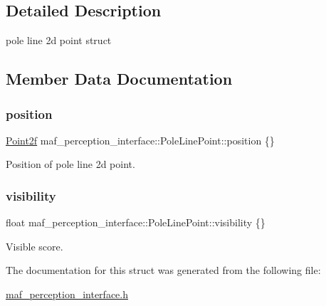 \subsection{Detailed Description}
pole line 2d point struct 

\subsection{Member Data Documentation}
\mbox{\label{structmaf__perception__interface_1_1PoleLinePoint_a6dcbf3c04ff7264c646ed626b6e497c4}} 
\subsubsection{\texorpdfstring{position}{position}}
{\footnotesize\ttfamily \hyperlink{structmaf__perception__interface_1_1Point2f}{Point2f} maf\+\_\+perception\+\_\+interface\+::\+Pole\+Line\+Point\+::position \{\}}



Position of pole line 2d point. 

\mbox{\label{structmaf__perception__interface_1_1PoleLinePoint_a7cb73abaca7893b818421376ffa92901}} 
\subsubsection{\texorpdfstring{visibility}{visibility}}
{\footnotesize\ttfamily float maf\+\_\+perception\+\_\+interface\+::\+Pole\+Line\+Point\+::visibility \{\}}



Visible score. 



The documentation for this struct was generated from the following file\+:\begin{DoxyCompactItemize}
\item 
\hyperlink{maf__perception__interface_8h}{maf\+\_\+perception\+\_\+interface.\+h}\end{DoxyCompactItemize}
